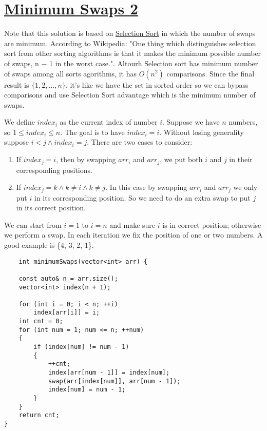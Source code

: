 \documentclass{book}
\begin{document}
	 \section{\href{https://www.hackerrank.com/challenges/minimum-swaps-2/problem}{Minimum Swaps 2}}
 	Note that this solution is based on \href{https://en.wikipedia.org/wiki/Selection_sort}{Selection Sort} in which the number of swaps are minimum. According to Wikipedia: "One thing which distinguishes selection sort from other sorting algorithms is that it makes the minimum possible number of swaps, n − 1 in the worst case.". Altourh Selection sort has minimum number of swaps among all sorts agorithms, it has $O(n^2)$ comparisons. Since the final result is $\{1, 2, \dots, n\}$, it's like we have the set in sorted order so we can bypass comparisons and use Selection Sort advantage which is the minimum number of swaps.
	 \par We define $index_i$ as the current index of number $i$. Suppose we have $n$ numbers, so $1 \le index_i \le n$. The goal is to have $index_i = i$. Without losing generality suppose $i < j \land index_i = j$. There are two cases to consider:
	 \begin{enumerate}
	 	\item If $index_j = i$, then by swapping $arr_i$ and $arr_j$, we put both $i$ and $j$ in their corresponding positions.
	 	\item If $index_j = k \land k \ne i \land k \ne j$. In this case by swapping $arr_i$ and $arr_j$ we only put $i$ in its corresponding position. So we need to do an extra swap to put $j$ in its correct position.
	 \end{enumerate}
 	We can start from $i = 1$ to $i = n$ and make sure $i$ is in correct position; otherwise we perform a swap. In each iteration we fix the position of one or two numbers. A good example is \{4, 3, 2, 1\}.
 	
 	\begin{lstlisting}
    int minimumSwaps(vector<int> arr) {

    const auto& n = arr.size();
    vector<int> index(n + 1);

    for (int i = 0; i < n; ++i)
        index[arr[i]] = i;
    int cnt = 0;
    for (int num = 1; num <= n; ++num)
    {
        if (index[num] != num - 1)
        {
            ++cnt;
            index[arr[num - 1]] = index[num];
            swap(arr[index[num]], arr[num - 1]);
            index[num] = num - 1;
        }
    }
    return cnt;
}
 	\end{lstlisting}
\end{document}

